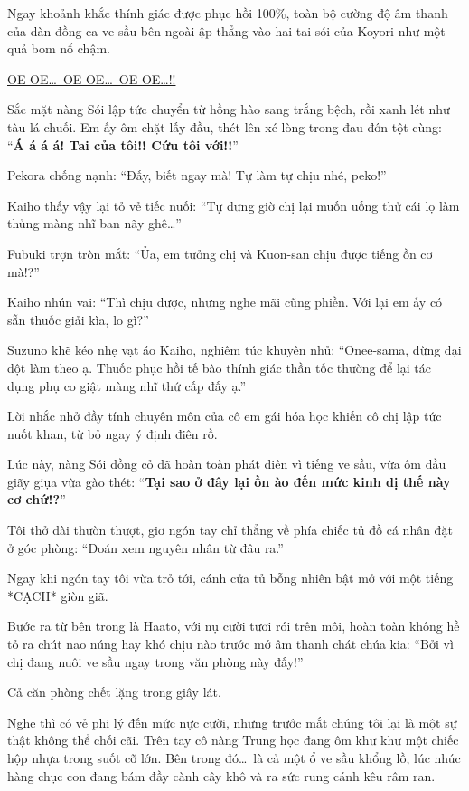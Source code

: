 \documentclass[../main.tex]{subfiles}
\begin{document}
Ngay khoảnh khắc thính giác được phục hồi 100\%, toàn bộ cường độ âm thanh của dàn đồng ca ve sầu bên ngoài ập thẳng vào hai tai sói của Koyori như một quả bom nổ chậm.

\begin{center}
  \uline{OE OE\dots\ OE OE\dots\ OE OE\dots!!}
\end{center}

Sắc mặt nàng Sói lập tức chuyển từ hồng hào sang trắng bệch, rồi xanh lét như tàu lá chuối. Em ấy ôm chặt lấy đầu, thét lên xé lòng trong đau đớn tột cùng: ``\textbf{Á á á á! Tai của tôi!! Cứu tôi với!!}''


Pekora chống nạnh: ``Đấy, biết ngay mà! Tự làm tự chịu nhé, peko!''

Kaiho thấy vậy lại tỏ vẻ tiếc nuối: ``Tự dưng giờ chị lại muốn uống thử cái lọ làm thủng màng nhĩ ban nãy ghê\dots''

Fubuki trợn tròn mắt: ``Ủa, em tưởng chị và Kuon-san chịu được tiếng ồn cơ mà!?''

Kaiho nhún vai: ``Thì chịu được, nhưng nghe mãi cũng phiền. Với lại em ấy có sẵn thuốc giải kìa, lo gì?''

Suzuno khẽ kéo nhẹ vạt áo Kaiho, nghiêm túc khuyên nhủ: ``Onee-sama, đừng dại dột làm theo ạ. Thuốc phục hồi tế bào thính giác thần tốc thường để lại tác dụng phụ co giật màng nhĩ thứ cấp đấy ạ.''

Lời nhắc nhở đầy tính chuyên môn của cô em gái hóa học khiến cô chị lập tức nuốt khan, từ bỏ ngay ý định điên rồ.

Lúc này, nàng Sói đồng cỏ đã hoàn toàn phát điên vì tiếng ve sầu, vừa ôm đầu giãy giụa vừa gào thét: ``\textbf{Tại sao ở đây lại ồn ào đến mức kinh dị thế này cơ chứ!?}''

Tôi thở dài thườn thượt, giơ ngón tay chỉ thẳng về phía chiếc tủ đồ cá nhân đặt ở góc phòng: ``Đoán xem nguyên nhân từ đâu ra.''

Ngay khi ngón tay tôi vừa trỏ tới, cánh cửa tủ bỗng nhiên bật mở với một tiếng *CẠCH* giòn giã.

Bước ra từ bên trong là Haato, với nụ cười tươi rói trên môi, hoàn toàn không hề tỏ ra chút nao núng hay khó chịu nào trước mớ âm thanh chát chúa kia: ``Bởi vì chị đang nuôi ve sầu ngay trong văn phòng này đấy!''

Cả căn phòng chết lặng trong giây lát.

Nghe thì có vẻ phi lý đến mức nực cười, nhưng trước mắt chúng tôi lại là một sự thật không thể chối cãi. Trên tay cô nàng Trung học đang ôm khư khư một chiếc hộp nhựa trong suốt cỡ lớn. Bên trong đó\dots\ là cả một ổ ve sầu khổng lồ, lúc nhúc hàng chục con đang bám đầy cành cây khô và ra sức rung cánh kêu râm ran.
\end{document}
